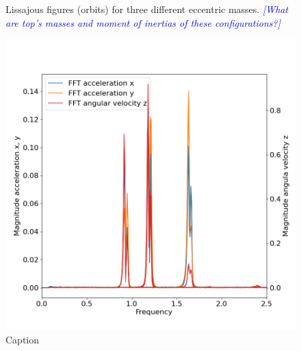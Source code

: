 \documentclass{article}
\newcommand{\andy}[1]{\textcolor{blue}{\emph{#1}}}
\begin{document}
\begin{figure}
\begin{subfigure}[b]{0.45\textwidth}
        \caption{}
        \label{fig:high-mass:orbit}
    \end{subfigure}
    
    
    \caption{Lissajous figures (orbits) for three different eccentric masses. \andy{[What are top's masses and moment of inertias of these configurations?]}}
    \label{fig:high-mass}
\end{figure}

\begin{figure}
    \centering
    \includegraphics[width=0.5\linewidth]{results/experiment/spectrum.png}
    \caption{Caption}
    \label{fig:spectrum}
\end{figure}

\clearpage


\end{document}
